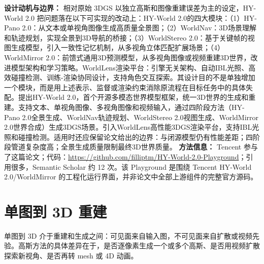 \textbf{设计动机与边界：} 相对原始 3DGS 以独立高斯和图像重建误差为主的设定，HY-World 2.0 把问题落在以下可实现的改动上：HY-World 2.0的四大模块：（1）HY-Pano 2.0：从文本或单视角图像生成高质量全景图；（2）WorldNav：3D场景理解和轨迹规划，实现全景到3D导航的桥接；（3）WorldStereo 2.0：基于关键帧的视图生成模型，引入一致性记忆机制，从多视角立体匹配扩展场景；（4）WorldMirror 2.0：前馈式通用3D预测模型，从多视角图像或视频重建3D世界，改进模型架构和学习策略。WorldLens渲染平台：引擎无关架构、自动IBL光照、高效碰撞检测、训练-渲染协同设计，支持角色交互探索。其设计目的不是单独增加一个模块，而是用上述表示、监督或渲染约束消除原流程在目标任务中的具体失配。提出HY-World 2.0，首个开源多模态世界模型框架，统一3D世界的生成和重建。支持文本、单视角图像、多视角图像和视频输入，通过四阶段方法（HY-Pano 2.0全景生成、WorldNav轨迹规划、WorldStereo 2.0视图生成、WorldMirror 2.0世界合成）生成3DGS场景。引入WorldLens高性能3DGS渲染平台，支持IBL光照和碰撞检测。适用时还应保留论文给出的边界：与闭源模型仍有性能差距；四阶段管道复杂度高；全景生成质量限制最终3D世界质量。
\textbf{方法信息：} Tencent 参与了这篇论文；代码：\url{https://github.com/filliptm/HY-World-2.0-Playground}；引用很多，Semantic Scholar 约 12 次。该 Playground 是围绕 Tencent HY-World 2.0/WorldMirror 的工程化运行界面，并非论文中全部上游组件的完整官方源码。



\section{单图到 3D 重建}

单图到 3D 介于重建和生成之间：可见面来自输入图，不可见面来自扩散或视频先验。高斯方法的具体差异在于，是否逐像素生成一个或多个高斯、是否用视频扩散探索新视角、是否再转 mesh 或 4D 动画。


